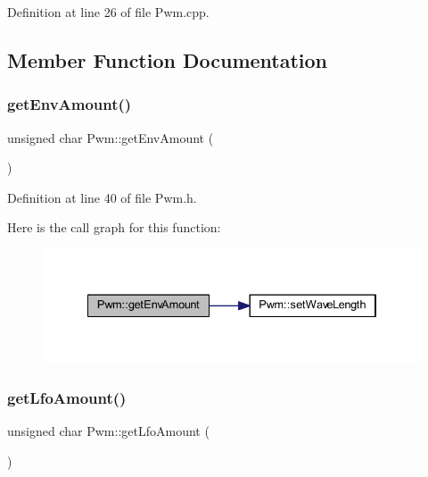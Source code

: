 Definition at line 26 of file Pwm.\+cpp.



\subsection{Member Function Documentation}
\mbox{\label{class_pwm_ada7e7bc3b17ee5fe5fb7af5379486e8e}} 
\subsubsection{\texorpdfstring{get\+Env\+Amount()}{getEnvAmount()}}
{\footnotesize\ttfamily unsigned char Pwm\+::get\+Env\+Amount (\begin{DoxyParamCaption}{ }\end{DoxyParamCaption})\hspace{0.3cm}{\ttfamily [inline]}}



Definition at line 40 of file Pwm.\+h.

Here is the call graph for this function\+:
\nopagebreak
\begin{figure}[H]
\begin{center}
\leavevmode
\includegraphics[width=334pt]{class_pwm_ada7e7bc3b17ee5fe5fb7af5379486e8e_cgraph}
\end{center}
\end{figure}
\mbox{\label{class_pwm_a7b41dfa02ff30f6260b81c75627ed333}} 
\subsubsection{\texorpdfstring{get\+Lfo\+Amount()}{getLfoAmount()}}
{\footnotesize\ttfamily unsigned char Pwm\+::get\+Lfo\+Amount (\begin{DoxyParamCaption}{ }\end{DoxyParamCaption})\hspace{0.3cm}{\ttfamily [inline]}}



